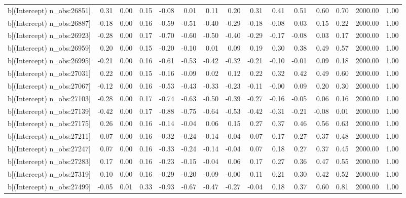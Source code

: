 \begin{table}[ht]
\begin{tabular}{rrrrrrrrrrrrrrr}
  b[(Intercept) n\_obs:26851] & 0.31 & 0.00 & 0.15 & -0.08 & 0.01 & 0.11 & 0.20 & 0.31 & 0.41 & 0.51 & 0.60 & 0.70 & 2000.00 & 1.00 \\ 
  b[(Intercept) n\_obs:26887] & -0.18 & 0.00 & 0.16 & -0.59 & -0.51 & -0.40 & -0.29 & -0.18 & -0.08 & 0.03 & 0.15 & 0.22 & 2000.00 & 1.00 \\ 
  b[(Intercept) n\_obs:26923] & -0.28 & 0.00 & 0.17 & -0.70 & -0.60 & -0.50 & -0.40 & -0.29 & -0.17 & -0.08 & 0.03 & 0.17 & 2000.00 & 1.00 \\ 
  b[(Intercept) n\_obs:26959] & 0.20 & 0.00 & 0.15 & -0.20 & -0.10 & 0.01 & 0.09 & 0.19 & 0.30 & 0.38 & 0.49 & 0.57 & 2000.00 & 1.00 \\ 
  b[(Intercept) n\_obs:26995] & -0.21 & 0.00 & 0.16 & -0.61 & -0.53 & -0.42 & -0.32 & -0.21 & -0.10 & -0.01 & 0.09 & 0.18 & 2000.00 & 1.00 \\ 
  b[(Intercept) n\_obs:27031] & 0.22 & 0.00 & 0.15 & -0.16 & -0.09 & 0.02 & 0.12 & 0.22 & 0.32 & 0.42 & 0.49 & 0.60 & 2000.00 & 1.00 \\ 
  b[(Intercept) n\_obs:27067] & -0.12 & 0.00 & 0.16 & -0.53 & -0.43 & -0.33 & -0.23 & -0.11 & -0.00 & 0.09 & 0.20 & 0.30 & 2000.00 & 1.00 \\ 
  b[(Intercept) n\_obs:27103] & -0.28 & 0.00 & 0.17 & -0.74 & -0.63 & -0.50 & -0.39 & -0.27 & -0.16 & -0.05 & 0.06 & 0.16 & 2000.00 & 1.00 \\ 
  b[(Intercept) n\_obs:27139] & -0.42 & 0.00 & 0.17 & -0.88 & -0.75 & -0.64 & -0.53 & -0.42 & -0.31 & -0.21 & -0.08 & 0.01 & 2000.00 & 1.00 \\ 
  b[(Intercept) n\_obs:27175] & 0.26 & 0.00 & 0.16 & -0.14 & -0.04 & 0.06 & 0.15 & 0.27 & 0.37 & 0.46 & 0.56 & 0.63 & 2000.00 & 1.00 \\ 
  b[(Intercept) n\_obs:27211] & 0.07 & 0.00 & 0.16 & -0.32 & -0.24 & -0.14 & -0.04 & 0.07 & 0.17 & 0.27 & 0.37 & 0.48 & 2000.00 & 1.00 \\ 
  b[(Intercept) n\_obs:27247] & 0.07 & 0.00 & 0.16 & -0.33 & -0.24 & -0.14 & -0.04 & 0.07 & 0.18 & 0.27 & 0.37 & 0.45 & 2000.00 & 1.00 \\ 
  b[(Intercept) n\_obs:27283] & 0.17 & 0.00 & 0.16 & -0.23 & -0.15 & -0.04 & 0.06 & 0.17 & 0.27 & 0.36 & 0.47 & 0.55 & 2000.00 & 1.00 \\ 
  b[(Intercept) n\_obs:27319] & 0.10 & 0.00 & 0.16 & -0.29 & -0.20 & -0.09 & -0.00 & 0.11 & 0.21 & 0.30 & 0.42 & 0.52 & 2000.00 & 1.00 \\ 
  b[(Intercept) n\_obs:27499] & -0.05 & 0.01 & 0.33 & -0.93 & -0.67 & -0.47 & -0.27 & -0.04 & 0.18 & 0.37 & 0.60 & 0.81 & 2000.00 & 1.00 \\ 

\end{tabular}
\end{table}
